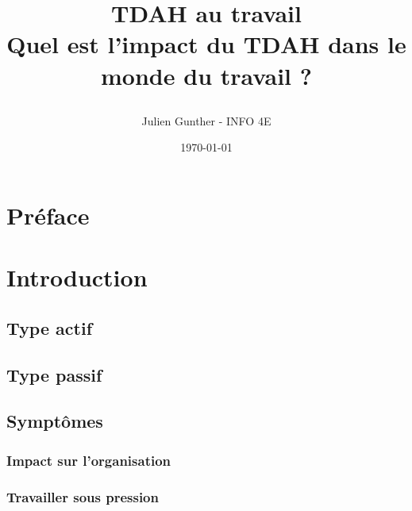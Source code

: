 \documentclass[a4paper, 11pt]{report}
\begin{document}
\begin{title}

\author{Julien Gunther - INFO 4E}
\title{
    {\Huge TDAH au travail}\\
    \vspace{1 cm}
    \vspace{3 cm}
    {\Large Quel est l'impact du TDAH dans le monde du travail ?}\\
    \vspace{1 cm}
    {\date{\Large \today}}}
\end{title}
\maketitle
\clearpage

\tableofcontents
\clearpage

\section{Préface}


\clearpage



\section{Introduction}

\subsection{Type actif}

\subsection{Type passif}

\subsection{Symptômes}

\subsubsection{Impact sur l'organisation}

\subsubsection{Travailler sous pression}

\end{document}
